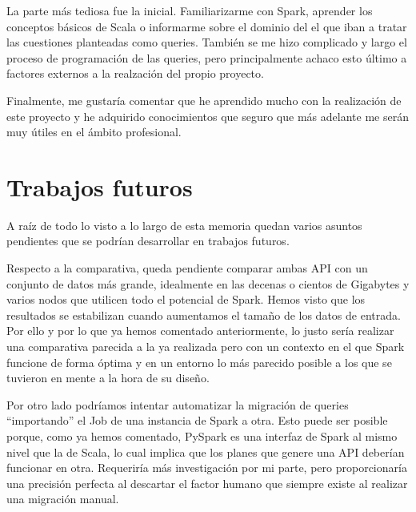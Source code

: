 \documentclass[12pt,twoside,titlepage]{report}
\newcommand{\quotes}[1]{``#1''}
\begin{document}
La parte más tediosa fue la inicial. Familiarizarme con Spark, aprender los conceptos básicos de Scala o informarme sobre el dominio del el que iban a tratar las cuestiones planteadas como queries. También se me hizo complicado y largo el proceso de programación de las queries, pero principalmente achaco esto último a factores externos a la realzación del propio proyecto.

Finalmente, me gustaría comentar que he aprendido mucho con la realización de este proyecto y he adquirido conocimientos que seguro que más adelante me serán muy útiles en el ámbito profesional.

\section{Trabajos futuros}

A raíz de todo lo visto a lo largo de esta memoria quedan varios asuntos pendientes que se podrían desarrollar en trabajos futuros.

Respecto a la comparativa, queda pendiente comparar ambas API con un conjunto de datos más grande, idealmente en las decenas o cientos de Gigabytes y varios nodos que utilicen todo el potencial de Spark. Hemos visto que los resultados se estabilizan cuando aumentamos el tamaño de los datos de entrada. Por ello y por lo que ya hemos comentado anteriormente, lo justo sería realizar una comparativa parecida a la ya realizada pero con un contexto en el que Spark funcione de forma óptima y en un entorno lo más parecido posible a los que se tuvieron en mente a la hora de su diseño.




Por otro lado podríamos intentar automatizar la migración de queries \quotes{importando} el Job de una instancia de Spark a otra. Esto puede ser posible porque, como ya hemos comentado, PySpark es una interfaz de Spark al mismo nivel que la de Scala, lo cual implica que los planes que genere una API deberían funcionar en otra. Requeriría más investigación por mi parte, pero proporcionaría una precisión perfecta al descartar el factor humano que siempre existe al realizar una migración manual.
\end{document}
